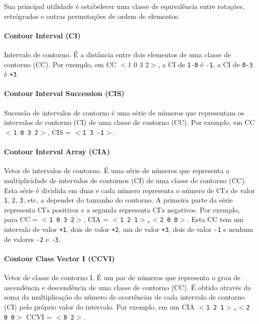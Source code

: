 \documentclass[12pt,brazil]{book}
\begin{document}
Sua principal utilidade é estabelecer uma classe de equivalência entre
rotações, retrógrados e outras permutações de ordem de elementos.

\paragraph{Contour Interval (CI)}
\label{sec:contour-interval-ci}

Intervalo de contorno. É a distância entre dois elementos de uma
classe de contorno (CC). Por exemplo, em CC $<$1 0 3 2$>$, a CI de \texttt{1-0} é
\texttt{-1}, a CI de \texttt{0-3} é \texttt{+3}.

\paragraph{Contour Interval Succession (CIS)}
\label{sec:cont-interv-succ}

Sucessão de intervalos de contorno é uma série de números que
representam os intervalos de contorno (CI) de uma classe de contorno
(CC). Por exemplo, em CC \texttt{$<$1 0 3 2$>$}, CIS = \texttt{$<$1 3 -1$>$}.

\paragraph{Contour Interval Array (CIA)}
\label{sec:cont-interv-array}

Vetor de intervalos de contorno. É uma série de números que representa
a multiplicidade de intervalos de contornos (CI) de uma classe de
contorno (CC). Esta série é dividida em duas e cada número representa
o número de CI's de valor \texttt{1}, \texttt{2}, \texttt{3}, etc, a
depender do tamanho do contorno. A primeira parte da série representa
CI's positivos e a segunda representa CI's negativos. Por exemplo,
para CC = \texttt{$<$1 0 3 2$>$}, CIA = \texttt{$<$1 2 1$>$,$<$2 0
  0$>$}. Esta CC tem um intervalo de valor \texttt{+1}, dois de valor
\texttt{+2}, um de valor \texttt{+3}, dois de valor \texttt{-1} e
nenhum de valores \texttt{-2} e \texttt{-3}.

\paragraph{Contour Class Vector I (CCVI)}
\label{sec:contour-class-vector-1}

Vetor de classe de contorno I. É um par de números que representa o
grau de ascendência e descendência de uma classe de contorno (CC). É
obtido através da soma da multiplicação do número de ocorrências de
cada intervalo de contorno (CI) pelo próprio valor do intervalo. Por
exemplo, em um CIA \texttt{$<$1 2 1$>$,$<$2 0 0$>$} CCVI =
\texttt{$<$8 2$>$}.
\end{document}
